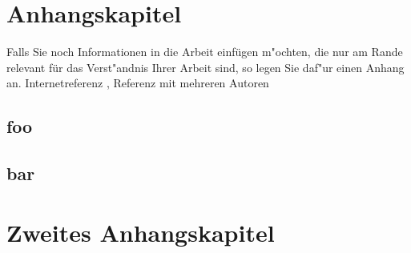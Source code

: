 \documentclass{sikthesis}
\begin{document}

\frontmatter

\sikDate{\today} %

\sikTitlePage




\tableofcontents

\mainmatter







\listoffigures
\listoftables




\begin{appendix}
\chapter{Anhangskapitel}
Falls Sie noch Informationen in die Arbeit einfügen m"ochten, die nur
am Rande relevant für das Verst"andnis Ihrer Arbeit sind, so legen
Sie daf"ur einen Anhang an.
Internetreferenz \cite{heise}, Referenz mit mehreren Autoren \cite{liu73acm}
\section{foo}
\section{bar}
\chapter{Zweites Anhangskapitel}
\end{appendix}

\backmatter
\end{document}
